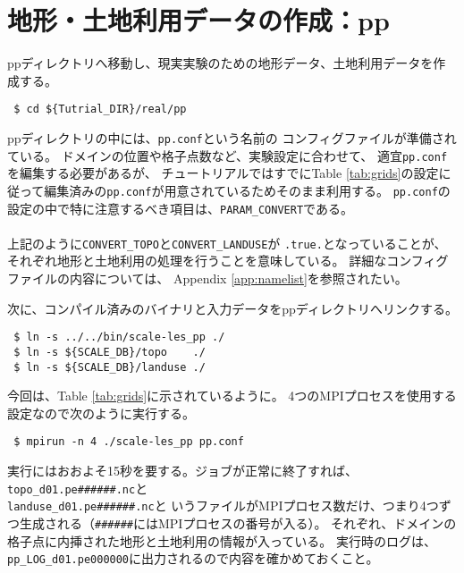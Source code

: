 
\section{地形・土地利用データの作成：pp}

ppディレクトリへ移動し、現実実験のための地形データ、土地利用データを作成する。
\begin{verbatim}
 $ cd ${Tutrial_DIR}/real/pp
\end{verbatim}
ppディレクトリの中には、\verb|pp.conf|という名前の
コンフィグファイルが準備されている。
ドメインの位置や格子点数など、実験設定に合わせて、
適宜\verb|pp.conf|を編集する必要があるが、
チュートリアルではすでにTable \ref{tab:grids}の設定に
従って編集済みの\verb|pp.conf|が用意されているためそのまま利用する。
\verb|pp.conf|の設定の中で特に注意するべき項目は、\verb|PARAM_CONVERT|である。\\

\\

\noindent 上記のように\verb|CONVERT_TOPO|と\verb|CONVERT_LANDUSE|が
\verb|.true.|となっていることが、
それぞれ地形と土地利用の処理を行うことを意味している。
詳細なコンフィグファイルの内容については、
Appendix \ref{app:namelist}を参照されたい。

次に、コンパイル済みのバイナリと入力データをppディレクトリへリンクする。
\begin{verbatim}
 $ ln -s ../../bin/scale-les_pp ./
 $ ln -s ${SCALE_DB}/topo    ./
 $ ln -s ${SCALE_DB}/landuse ./
\end{verbatim}
今回は、Table \ref{tab:grids}に示されているように。
4つのMPIプロセスを使用する設定なので次のように実行する。
\begin{verbatim}
 $ mpirun -n 4 ./scale-les_pp pp.conf
\end{verbatim}
実行にはおおよそ15秒を要する。ジョブが正常に終了すれば、\verb|topo_d01.pe######.nc|と\\
\verb|landuse_d01.pe######.nc|と
いうファイルがMPIプロセス数だけ、つまり4つずつ生成される（\verb|######|にはMPIプロセスの番号が入る）。
それぞれ、ドメインの格子点に内挿された地形と土地利用の情報が入っている。
実行時のログは、\verb|pp_LOG_d01.pe000000|に出力されるので内容を確かめておくこと。


